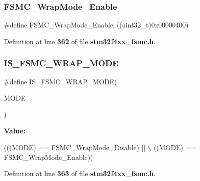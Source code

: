 \subsubsection{F\+S\+M\+C\+\_\+\+Wrap\+Mode\+\_\+\+Enable}
{\footnotesize\ttfamily \#define F\+S\+M\+C\+\_\+\+Wrap\+Mode\+\_\+\+Enable~((uint32\+\_\+t)0x00000400)}



Definition at line \textbf{ 362} of file \textbf{ stm32f4xx\+\_\+fsmc.\+h}.

\mbox{\label{group__FSMC__Wrap__Mode_ga0751d74b7fb1e17f6cedea091e8ebfc8}} 
\subsubsection{I\+S\+\_\+\+F\+S\+M\+C\+\_\+\+W\+R\+A\+P\+\_\+\+M\+O\+DE}
{\footnotesize\ttfamily \#define I\+S\+\_\+\+F\+S\+M\+C\+\_\+\+W\+R\+A\+P\+\_\+\+M\+O\+DE(\begin{DoxyParamCaption}\item[{}]{M\+O\+DE }\end{DoxyParamCaption})}

{\bfseries Value\+:}
\begin{DoxyCode}
(((MODE) == FSMC_WrapMode_Disable) || \(\backslash\)
                                 ((MODE) == FSMC_WrapMode_Enable))
\end{DoxyCode}


Definition at line \textbf{ 363} of file \textbf{ stm32f4xx\+\_\+fsmc.\+h}.

